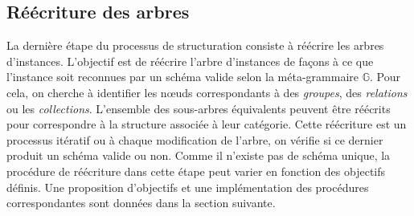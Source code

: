 \subsection{Réécriture des arbres}
\label{sec:struct:auto:rewrite}
La dernière étape du processus de structuration consiste à réécrire les arbres d'instances.
L'objectif est de réécrire l'arbre d'instances de façons à ce que l'instance soit reconnues par un schéma valide selon la méta-grammaire $\mathbb{G}$.
Pour cela, on cherche à identifier les nœuds correspondants à des \emph{groupes}, des \emph{relations} ou les \emph{collections}.
L'ensemble des sous-arbres équivalents peuvent être réécrits pour correspondre à la structure associée à leur catégorie.
Cette réécriture est un processus itératif ou à chaque modification de l'arbre, on vérifie si ce dernier produit un schéma valide ou non.
Comme il n'existe pas de schéma unique, la procédure de réécriture dans cette étape peut varier en fonction des objectifs définis.
Une proposition d'objectifs et une implémentation des procédures correspondantes sont données dans la section suivante.

\FloatBarrier
